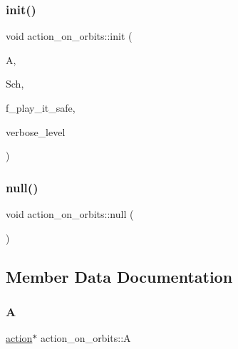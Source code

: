 \mbox{\label{classaction__on__orbits_afec4b044b202a0226de13bc1f5c90a4f}} 
\subsubsection{\texorpdfstring{init()}{init()}}
{\footnotesize\ttfamily void action\+\_\+on\+\_\+orbits\+::init (\begin{DoxyParamCaption}\item[{\mbox{\hyperlink{classaction}{action}} $\ast$}]{A,  }\item[{\mbox{\hyperlink{classschreier}{schreier}} $\ast$}]{Sch,  }\item[{\mbox{\hyperlink{galois_8h_a09fddde158a3a20bd2dcadb609de11dc}{I\+NT}}}]{f\+\_\+play\+\_\+it\+\_\+safe,  }\item[{\mbox{\hyperlink{galois_8h_a09fddde158a3a20bd2dcadb609de11dc}{I\+NT}}}]{verbose\+\_\+level }\end{DoxyParamCaption})}

\mbox{\label{classaction__on__orbits_a033e5a9fa0598c832a1e774497cbd00d}} 
\subsubsection{\texorpdfstring{null()}{null()}}
{\footnotesize\ttfamily void action\+\_\+on\+\_\+orbits\+::null (\begin{DoxyParamCaption}{ }\end{DoxyParamCaption})}



\subsection{Member Data Documentation}
\mbox{\label{classaction__on__orbits_a0093589ff431dbef11cfdde928b4b5f3}} 
\subsubsection{\texorpdfstring{A}{A}}
{\footnotesize\ttfamily \mbox{\hyperlink{classaction}{action}}$\ast$ action\+\_\+on\+\_\+orbits\+::A}

